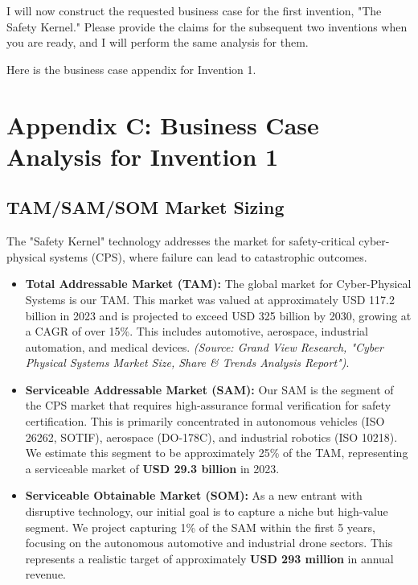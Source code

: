 \documentclass{article}
\begin{document}
I will now construct the requested business case for the first invention, "The Safety Kernel." Please provide the claims for the subsequent two inventions when you are ready, and I will perform the same analysis for them.

Here is the business case appendix for Invention 1.

\section{Appendix C: Business Case Analysis for Invention 1}

\subsection{TAM/SAM/SOM Market Sizing}

The "Safety Kernel" technology addresses the market for safety-critical cyber-physical systems (CPS), where failure can lead to catastrophic outcomes.

\begin{itemize}
    \item \textbf{Total Addressable Market (TAM):} The global market for Cyber-Physical Systems is our TAM. This market was valued at approximately USD 117.2 billion in 2023 and is projected to exceed USD 325 billion by 2030, growing at a CAGR of over 15\%. This includes automotive, aerospace, industrial automation, and medical devices.
    \textit{(Source: Grand View Research, "Cyber Physical Systems Market Size, Share \& Trends Analysis Report")}.

    \item \textbf{Serviceable Addressable Market (SAM):} Our SAM is the segment of the CPS market that requires high-assurance formal verification for safety certification. This is primarily concentrated in autonomous vehicles (ISO 26262, SOTIF), aerospace (DO-178C), and industrial robotics (ISO 10218). We estimate this segment to be approximately 25\% of the TAM, representing a serviceable market of \textbf{USD 29.3 billion} in 2023.

    \item \textbf{Serviceable Obtainable Market (SOM):} As a new entrant with disruptive technology, our initial goal is to capture a niche but high-value segment. We project capturing 1\% of the SAM within the first 5 years, focusing on the autonomous automotive and industrial drone sectors. This represents a realistic target of approximately \textbf{USD 293 million} in annual revenue.
\end{itemize}
\end{document}
